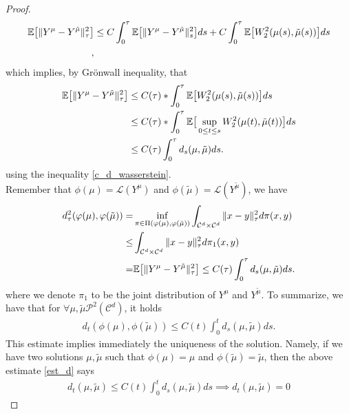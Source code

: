 \begin{proof}
 \begin{align*}
   \mathbb{E}\big[\|Y^{\mu } - Y^{\tilde{\mu } }\|_{\tau}^2\big] &\le C \int_0^{\tau } \mathbb{E}\big[\|Y^{\mu } - Y^{\tilde{\mu } }\|_s^2\big] ds + C \int_0^{\tau } \mathbb{E}\big[W_2^2(\mu(s),\tilde{\mu }(s) )\big]  ds  \\
 ,\end{align*}
 which implies, by Grönwall inequality, that
 \begin{align*}
   \mathbb{E}\big[\|Y^{\mu } - Y^{\tilde{\mu } }\|_{\tau}^2\big] &\le C(\tau )* \int_0^{\tau }  \mathbb{E}\big[W_2^2(\mu(s) ,\tilde{\mu }(s) )\big] ds \\                                               
                                                 &\le C(\tau )* \int_0^{\tau } \mathbb{E}\big[ \sup_{0\le t \le s} W_2^2(\mu(t) ,\tilde{\mu }(t) )\big] ds \\                                              
                                                 &\le C(\tau ) \int_0^{\tau } d_s(\mu ,\tilde{\mu } )ds
 .\end{align*}
 using  the inequality \autoref{c_d_wasserstein}.\\[1ex]
 Remember that $\phi(\mu) = \mathcal{L}(Y^{\mu } )$ and $\phi(\tilde{\mu } ) = \mathcal{L}(Y^{\tilde{\mu } } )$, we have
 \begin{align*}
   d_{\tau }^2(\varphi(\mu ),\varphi(\tilde{\mu } )) =&  \inf_{\pi  \in  \Pi(\varphi(\mu) ,\varphi(\tilde{\mu } ))} \int_{\mathcal{C}^{d} \times  \mathcal{C}^{d}   } \|x-y\|_\tau^2 d\pi(x,y)\\
   \leq &
\int_{\mathcal{C}^{d}\times\mathcal{C}^{d}  } \|x-y\|_{\tau }^{2} d\pi_1(x,y) \\
= & \mathbb{E}\big[\|Y^{\mu }-Y^{\tilde{\mu } } \|_\tau^2 \big] \le  C(\tau ) \int_0^{\tau } d_s(\mu ,\tilde{\mu } )ds
 .\end{align*} 
 where we denote  $\pi_1$ to be the joint distribution of $Y^{\mu } $ and $Y^{\tilde{\mu } }$.
 To summarize, we have that for $\forall  \mu , \tilde{\mu } \mathcal{P}^2(\mathcal{C}^{d} ) $, it holds
 \begin{align}\label{est_d}
   d_t(\phi(\mu ),\phi(\tilde{\mu } )) \le C(t) \int_0^{t} d_s(\mu ,\tilde{\mu } ) ds 
 .\end{align}
This estimate implies immediately the uniqueness of the solution. Namely, if we have two solutions $\mu ,\tilde{\mu } $ such that $  \phi(\mu ) = \mu $ and $ \phi(\tilde{\mu } ) = \tilde{\mu } $,
then the above estimate \autoref{est_d} says 
\begin{align*}
  d_t(\mu,\tilde{\mu } ) \le  C(t) \int_0^{t} d_s(\mu ,\tilde{\mu } )  ds \implies d_t(\mu ,\tilde{\mu } )  = 0

\end{align*}
\end{proof}
